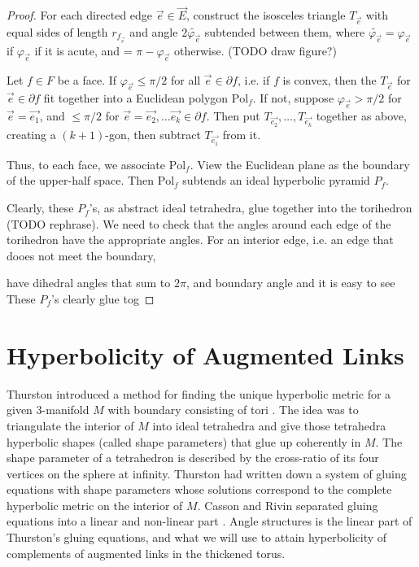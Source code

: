 \documentclass[11pt]{amsart}
\newcommand{\del}{\partial}
\newcommand{\vphi}{\varphi}
\newcommand{\Pol}{{\text{Pol}}}
\theoremstyle{plain}
\theoremstyle{definition}
\begin{document}
\begin{proof}
For each directed edge $\vec{e} \in \vec{E}$,
construct the isosceles triangle $T_{\vec{e}}$
with equal sides of length $r_{f_{\vec{e}}}$ and
angle $2\tilde{\vphi_{\vec{e}}}$ subtended between them,
where $\tilde{\vphi_{\vec{e}}} = \vphi_{\vec{e}}$
if $\vphi_{\vec{e}}$ if it is acute,
and = $\pi - \vphi_{\vec{e}}$ otherwise.
(TODO draw figure?)


Let $f \in F$ be a face.
If $\vphi_{\vec{e}} \leq \pi/2$ for all $\vec{e} \in \del f$,
i.e. if $f$ is convex, then 
the $T_{\vec{e}}$ for $\vec{e}\in \del f$
fit together into a Euclidean polygon $\Pol_f$.
If not, suppose $\vphi_{\vec{e}} > \pi/2$
for $\vec{e} = \vec{e_1}$, 
and $\leq \pi/2$ for $\vec{e} = \vec{e_2},\ldots \vec{e_k} \in \del f$.
Then put $T_{\vec{e_2}},\ldots,T_{\vec{e_k}}$ together as above,
creating a $(k+1)$-gon,
then subtract $T_{\vec{e_1}}$ from it.

Thus, to each face, we associate $\Pol_f$.
View the Euclidean plane as the boundary of the upper-half space.
Then $\Pol_f$ subtends an ideal hyperbolic pyramid $P_f$.

Clearly, these $P_f$'s, as abstract ideal tetrahedra,
glue together into the torihedron (TODO rephrase).
We need to check that the angles around each edge of
the torihedron have the appropriate angles.
For an interior edge, i.e. an edge that dooes not meet the boundary,

have dihedral angles that sum to $2\pi$,
and boundary angle
and it is easy to see
These $P_f$'s clearly glue tog

\end{proof}


\section{Hyperbolicity of Augmented Links}
Thurston introduced a method for finding the unique hyperbolic metric for a given 3-manifold $M$ with boundary consisting of tori \cite{Thurston}. The idea was to triangulate the interior of $M$ into ideal tetrahedra and give those tetrahedra hyperbolic shapes (called shape parameters) that glue up coherently in $M$. The shape parameter of a tetrahedron is described by the cross-ratio of its four vertices on the sphere at infinity. Thurston had written down a system of gluing equations with shape parameters whose solutions correspond to the complete hyperbolic metric on the interior of $M$. Casson and Rivin separated gluing equations into a linear and non-linear part \cite{Casson-Rivin}. Angle structures is the linear part of Thurston's gluing equations, and what we will use to attain hyperbolicity of complements of augmented links in the thickened torus. 
\end{document}

